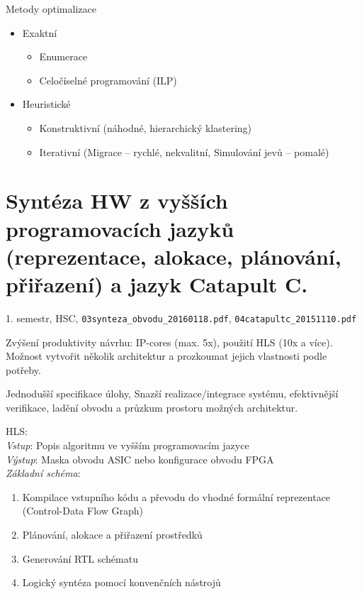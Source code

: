 \documentclass[a4paper, 11pt]{report}
\begin{document}
Metody optimalizace
\begin{itemize}
	\item Exaktní
	\begin{itemize}
		\item Enumerace
		\item Celočíselné programování (ILP)
	\end{itemize}
	\item Heuristické
	\begin{itemize}
		\item Konstruktivní (náhodné, hierarchický klastering)
		\item Iterativní (Migrace -- rychlé, nekvalitní, Simulování jevů -- pomalé)
	\end{itemize}
\end{itemize}






\chapter{Syntéza HW z vyšších programovacích jazyků (reprezentace, alokace, plánování, přiřazení) a jazyk Catapult C.} \label{cha:4}
1. semestr, HSC, \texttt{03synteza\_obvodu\_20160118.pdf}, \texttt{04catapultc\_20151110.pdf}

Zvýšení produktivity návrhu: IP-cores (max. 5x), použití HLS (10x a více). Možnost vytvořit několik architektur a prozkoumat jejich vlastnosti podle potřeby.

Jednodušší specifikace úlohy, Snazší realizace/integrace systému, efektivnější verifikace, ladění obvodu a průzkum prostoru možných architektur.

HLS:\\
\emph{Vstup}: Popis algoritmu ve vyšším programovacím jazyce\\
\emph{Výstup}: Maska obvodu ASIC nebo konfigurace obvodu FPGA\\
\emph{Základní schéma}:
\begin{enumerate}
	\item Kompilace vstupního kódu a převodu do vhodné formální reprezentace (Control-Data Flow Graph)
	\item Plánování, alokace a přiřazení prostředků
	\item Generování RTL schématu
	\item Logický syntéza pomocí konvenčních nástrojů
\end{enumerate}
\end{document}
